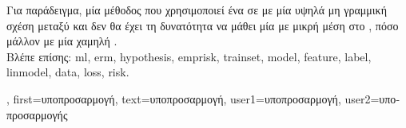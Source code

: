 {{\begin{figure}[H]
\begin{center}
		\end{center}
		\end{figure} 
		\foreignlanguage{greek}{Για παράδειγμα, μία μέθοδος}  \foreignlanguage{greek}{που χρησιμοποιεί 
		ένα}  \foreignlanguage{greek}{σε}  \foreignlanguage{greek}{με μία υψηλά μη 
		γραμμική σχέση μεταξύ}  \foreignlanguage{greek}{και} 
		\foreignlanguage{greek}{δεν θα έχει τη δυνατότητα να μάθει μία}  \foreignlanguage{greek}{με 
		μικρή μέση}  \foreignlanguage{greek}{στο} , \foreignlanguage{greek}{πόσο 
		μάλλον με μία χαμηλή} . 
		\\
		\foreignlanguage{greek}{Βλέπε επίσης:} \gls{ml}, \gls{erm}, \gls{hypothesis}, \gls{emprisk}, \gls{trainset}, \gls{model}, 
		\gls{feature}, \gls{label}, \gls{linmodel}, \gls{data}, \gls{loss}, \gls{risk}.},
	first={\foreignlanguage{greek}{υποπροσαρμογή}},
	text={\foreignlanguage{greek}{υποπροσαρμογή}},
	user1={\foreignlanguage{greek}{υποπροσαρμογή}}, %
    	user2={\foreignlanguage{greek}{υποπροσαρμογής}} %
}

